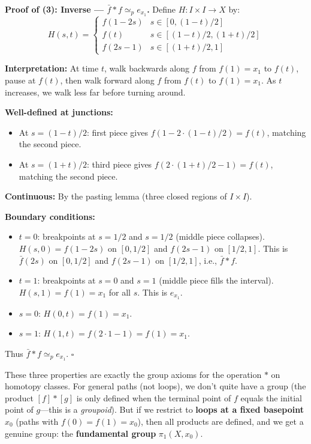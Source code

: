 \documentclass[11pt]{report}
\renewenvironment{proof}[1][Proof]{\noindent\textbf{#1.} }{\hfill$\square$\par\vspace{5pt}}
\begin{document}
\begin{proof}[Proof of (3): Inverse --- $\bar{f} * f \simeq_p e_{x_1}$]
Define $H: I \times I \to X$ by:
\[H(s, t) = \begin{cases} f(1 - 2s) & s \in [0, (1-t)/2] \\ f(t) & s \in [(1-t)/2, (1+t)/2] \\ f(2s - 1) & s \in [(1+t)/2, 1] \end{cases}\]

\textbf{Interpretation:} At time $t$, walk backwards along $f$ from $f(1) = x_1$ to $f(t)$, pause at $f(t)$, then walk forward along $f$ from $f(t)$ to $f(1) = x_1$. As $t$ increases, we walk less far before turning around.

\textbf{Well-defined at junctions:}
\begin{itemize}[nosep]
    \item At $s = (1-t)/2$: first piece gives $f(1 - 2 \cdot (1-t)/2) = f(t)$, matching the second piece. \checkmark
    \item At $s = (1+t)/2$: third piece gives $f(2 \cdot (1+t)/2 - 1) = f(t)$, matching the second piece. \checkmark
\end{itemize}

\textbf{Continuous:} By the pasting lemma (three closed regions of $I \times I$). \checkmark

\textbf{Boundary conditions:}
\begin{itemize}[nosep]
    \item $t = 0$: breakpoints at $s = 1/2$ and $s = 1/2$ (middle piece collapses). $H(s, 0) = f(1-2s)$ on $[0, 1/2]$ and $f(2s-1)$ on $[1/2, 1]$. This is $\bar{f}(2s)$ on $[0,1/2]$ and $f(2s-1)$ on $[1/2,1]$, i.e., $\bar{f} * f$. \checkmark
    \item $t = 1$: breakpoints at $s = 0$ and $s = 1$ (middle piece fills the interval). $H(s, 1) = f(1) = x_1$ for all $s$. This is $e_{x_1}$. \checkmark
    \item $s = 0$: $H(0, t) = f(1) = x_1$. \checkmark
    \item $s = 1$: $H(1, t) = f(2 \cdot 1 - 1) = f(1) = x_1$. \checkmark
\end{itemize}
Thus $\bar{f} * f \simeq_p e_{x_1}$.
\end{proof}

\begin{rembox}
These three properties are exactly the group axioms for the operation $*$ on homotopy classes. For general paths (not loops), we don't quite have a group (the product $[f] * [g]$ is only defined when the terminal point of $f$ equals the initial point of $g$---this is a \emph{groupoid}). But if we restrict to \textbf{loops at a fixed basepoint $x_0$} (paths with $f(0) = f(1) = x_0$), then all products are defined, and we get a genuine group: the \textbf{fundamental group} $\pi_1(X, x_0)$.
\end{rembox}
\end{document}
